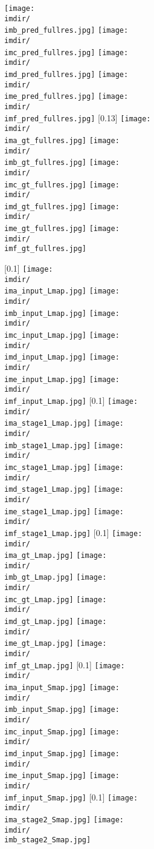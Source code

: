 \documentclass[runningheads]{llncs}
\begin{document}
\begin{figure*}[hthb]
{\texttt{[image: \\imdir/\\imb\_pred\_fullres.jpg]}
\texttt{[image: \\imdir/\\imc\_pred\_fullres.jpg]}
\texttt{[image: \\imdir/\\imd\_pred\_fullres.jpg]}
\texttt{[image: \\imdir/\\ime\_pred\_fullres.jpg]}
\texttt{[image: \\imdir/\\imf\_pred\_fullres.jpg]}
}
\subcaptionbox{}[0.13\linewidth]
{
\texttt{[image: \\imdir/\\ima\_gt\_fullres.jpg]}
\texttt{[image: \\imdir/\\imb\_gt\_fullres.jpg]}
\texttt{[image: \\imdir/\\imc\_gt\_fullres.jpg]}
\texttt{[image: \\imdir/\\imd\_gt\_fullres.jpg]}
\texttt{[image: \\imdir/\\ime\_gt\_fullres.jpg]}
\texttt{[image: \\imdir/\\imf\_gt\_fullres.jpg]}
}

\subcaptionbox{}[0.1\linewidth]
{
\texttt{[image: \\imdir/\\ima\_input\_Lmap.jpg]}
\texttt{[image: \\imdir/\\imb\_input\_Lmap.jpg]}
\texttt{[image: \\imdir/\\imc\_input\_Lmap.jpg]}
\texttt{[image: \\imdir/\\imd\_input\_Lmap.jpg]}
\texttt{[image: \\imdir/\\ime\_input\_Lmap.jpg]}
\texttt{[image: \\imdir/\\imf\_input\_Lmap.jpg]}
}
\subcaptionbox{}[0.1\linewidth]
{
\texttt{[image: \\imdir/\\ima\_stage1\_Lmap.jpg]}
\texttt{[image: \\imdir/\\imb\_stage1\_Lmap.jpg]}
\texttt{[image: \\imdir/\\imc\_stage1\_Lmap.jpg]}
\texttt{[image: \\imdir/\\imd\_stage1\_Lmap.jpg]}
\texttt{[image: \\imdir/\\ime\_stage1\_Lmap.jpg]}
\texttt{[image: \\imdir/\\imf\_stage1\_Lmap.jpg]}
}
\subcaptionbox{}[0.1\linewidth]
{
\texttt{[image: \\imdir/\\ima\_gt\_Lmap.jpg]}
\texttt{[image: \\imdir/\\imb\_gt\_Lmap.jpg]}
\texttt{[image: \\imdir/\\imc\_gt\_Lmap.jpg]}
\texttt{[image: \\imdir/\\imd\_gt\_Lmap.jpg]}
\texttt{[image: \\imdir/\\ime\_gt\_Lmap.jpg]}
\texttt{[image: \\imdir/\\imf\_gt\_Lmap.jpg]}
}
\subcaptionbox{}[0.1\linewidth]
{
\texttt{[image: \\imdir/\\ima\_input\_Smap.jpg]}
\texttt{[image: \\imdir/\\imb\_input\_Smap.jpg]}
\texttt{[image: \\imdir/\\imc\_input\_Smap.jpg]}
\texttt{[image: \\imdir/\\imd\_input\_Smap.jpg]}
\texttt{[image: \\imdir/\\ime\_input\_Smap.jpg]}
\texttt{[image: \\imdir/\\imf\_input\_Smap.jpg]}
}
\subcaptionbox{}[0.1\linewidth]
{
\texttt{[image: \\imdir/\\ima\_stage2\_Smap.jpg]}
\texttt{[image: \\imdir/\\imb\_stage2\_Smap.jpg]}
}
\end{figure*}
\end{document}
